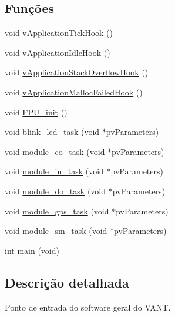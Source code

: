 \subsection*{Funções}
\begin{DoxyCompactItemize}
\item 
void \hyperlink{group__ProVANT__Modules_ga2850b09d1bb227364b5ff6de6f85f740}{v\-Application\-Tick\-Hook} ()
\item 
void \hyperlink{group__ProVANT__Modules_ga11cbdd335da884dec1204e230554bfd9}{v\-Application\-Idle\-Hook} ()
\item 
void \hyperlink{group__ProVANT__Modules_ga8f5b98d87cfd1379b8d6573159bcbdd3}{v\-Application\-Stack\-Overflow\-Hook} ()
\item 
void \hyperlink{group__ProVANT__Modules_ga73f6aa45470ada02a5d6f3a522d8f13c}{v\-Application\-Malloc\-Failed\-Hook} ()
\item 
void \hyperlink{group__ProVANT__Modules_ga73e2a1fcfc7e7f2bb22937e543997019}{F\-P\-U\-\_\-init} ()
\item 
void \hyperlink{group__ProVANT__Modules_ga39e7a5088757fe328c0162fe25d907bf}{blink\-\_\-led\-\_\-task} (void $\ast$pv\-Parameters)
\item 
void \hyperlink{group__ProVANT__Modules_gab0c5d271dba436247302632e599731ba}{module\-\_\-co\-\_\-task} (void $\ast$pv\-Parameters)
\item 
void \hyperlink{group__ProVANT__Modules_ga7de15cbee9a0ca9eafb3eb25f5e3d691}{module\-\_\-in\-\_\-task} (void $\ast$pv\-Parameters)
\item 
void \hyperlink{group__ProVANT__Modules_ga466679da7a6953ce332271681ce397c7}{module\-\_\-do\-\_\-task} (void $\ast$pv\-Parameters)
\item 
void \hyperlink{group__ProVANT__Modules_gac55e5b60dffafe957dddc7aa452bfa9d}{module\-\_\-gps\-\_\-task} (void $\ast$pv\-Parameters)
\item 
void \hyperlink{group__ProVANT__Modules_gaad8bcaa035ca56eddd3ccbf522298711}{module\-\_\-sm\-\_\-task} (void $\ast$pv\-Parameters)
\item 
int \hyperlink{group__ProVANT__Modules_ga840291bc02cba5474a4cb46a9b9566fe}{main} (void)
\end{DoxyCompactItemize}


\subsection{Descrição detalhada}
Ponto de entrada do software geral do V\-A\-N\-T. 

